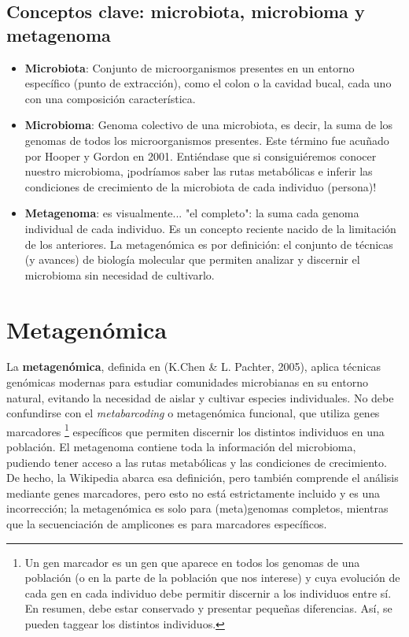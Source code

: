 \subsection{Conceptos clave: microbiota, microbioma y metagenoma}
\begin{itemize}
\item \textbf{Microbiota}: Conjunto de microorganismos presentes en un entorno específico (punto de extracción), como el colon o la cavidad bucal, cada uno con una composición característica.
\item \textbf{Microbioma}: Genoma colectivo de una microbiota, es decir, la suma de los genomas de todos los microorganismos presentes. Este término fue acuñado por Hooper y Gordon en 2001. Entiéndase que si consiguiéremos conocer nuestro microbioma, ¡podríamos saber las rutas metabólicas e inferir las condiciones de crecimiento de la microbiota de cada individuo (persona)!
\item \textbf{Metagenoma}: es visualmente... "el completo": la suma cada genoma individual de cada individuo. Es un concepto reciente nacido de la limitación de los anteriores. La metagenómica es por definición: el conjunto de técnicas (y avances) de biología molecular que permiten analizar y discernir el microbioma sin necesidad de cultivarlo.
\end{itemize}

\section{Metagenómica}
La \textbf{metagenómica}, definida en (K.Chen & L. Pachter, 2005), aplica técnicas genómicas modernas para estudiar comunidades microbianas en su entorno natural, evitando la necesidad de aislar y cultivar especies individuales. No debe confundirse con el \textit{metabarcoding} o metagenómica funcional, que utiliza genes marcadores \footnote{Un gen marcador es un gen que aparece en todos los genomas de una población (o en la parte de la población que nos interese) y cuya evolución de cada gen en cada individuo debe permitir discernir a los individuos entre sí. En resumen, debe estar conservado y presentar pequeñas diferencias. Así, se pueden taggear los distintos individuos.} específicos que permiten discernir los distintos individuos en una población. 
El metagenoma contiene toda la información del microbioma, pudiendo tener acceso a las rutas metabólicas y las condiciones de crecimiento. De hecho, la Wikipedia abarca esa definición, pero también comprende el análisis mediante genes marcadores, pero esto no está estrictamente incluido y es una incorrección; la metagenómica es solo para (meta)genomas completos, mientras que la secuenciación de amplicones es para marcadores específicos. 

